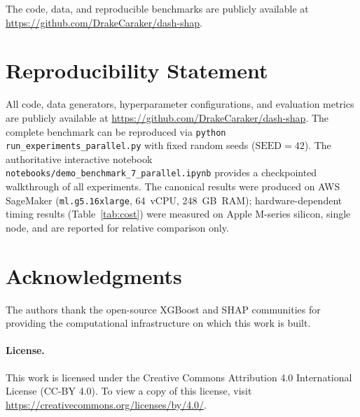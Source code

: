\documentclass[11pt]{article}
\begin{document}
The code, data, and reproducible benchmarks are publicly available at
\url{https://github.com/DrakeCaraker/dash-shap}.


\section*{Reproducibility Statement}

All code, data generators, hyperparameter configurations, and evaluation
metrics are publicly available at
\url{https://github.com/DrakeCaraker/dash-shap}. The complete benchmark
can be reproduced via \texttt{python run\_experiments\_parallel.py} with fixed
random seeds ($\text{SEED} = 42$). The authoritative interactive
notebook \texttt{notebooks/demo\_benchmark\_7\_parallel.ipynb} provides a
checkpointed walkthrough of all experiments. The canonical results were
produced on AWS SageMaker (\texttt{ml.g5.16xlarge}, 64~vCPU, 248~GB~RAM);
hardware-dependent timing results (Table~\ref{tab:cost}) were measured on
Apple M-series silicon, single node, and are reported for relative comparison only.

\section*{Acknowledgments}

The authors thank the open-source XGBoost and SHAP communities for
providing the computational infrastructure on which this work is built.

\paragraph{License.}
This work is licensed under the Creative Commons Attribution 4.0
International License (CC-BY 4.0). To view a copy of this license, visit
\url{https://creativecommons.org/licenses/by/4.0/}.



% 
\end{document}
